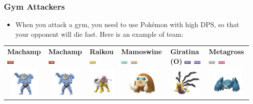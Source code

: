 \documentclass[8pt,aspectratio=169,compress]{beamer}
\newcommand{\fightingfull}{\includegraphics[height=0.15cm]{../../images/type/full/Fighting.png}}
\newcommand{\electricfull}{\includegraphics[height=0.15cm]{../../images/type/full/Electric.png}}
\newcommand{\ghostfull}{\includegraphics[height=0.15cm]{../../images/type/full/Ghost.png}}
\newcommand{\dragonfull}{\includegraphics[height=0.15cm]{../../images/type/full/Dragon.png}}
\newcommand{\groundfull}{\includegraphics[height=0.15cm]{../../images/type/full/Ground.png}}
\newcommand{\icefull}{\includegraphics[height=0.15cm]{../../images/type/full/Ice.png}}
\newcommand{\psychicfull}{\includegraphics[height=0.15cm]{../../images/type/full/Psychic.png}}
\newcommand{\steelfull}{\includegraphics[height=0.15cm]{../../images/type/full/Steel.png}}
\begin{document}
\begin{frame}
\frametitle{Gym Attackers}

\begin{block}{}
\begin{tiny}

\begin{itemize}
\item When you attack a gym, you need to use Pok\'emon with high DPS, so that your opponent will die fast. Here is an example of team:
\end{itemize}

\begin{tabular}{p{1.9cm}p{1.9cm}p{1.9cm}p{1.9cm}p{1.9cm}p{1.9cm}} 
\textbf{Machamp} \hfill \fightingfull & \textbf{Machamp} \hfill \fightingfull&  \textbf{Raikou} \hfill \electricfull&  \textbf{Mamoswine} \hfill  \icefull~\groundfull&  \textbf{Giratina (O)} \hfill \ghostfull~\dragonfull & \textbf{Metagross} \hfill \steelfull~\psychicfull  \\ 
\multicolumn{1}{c}{\includegraphics[width=1.5cm]{../../images/pokemon/Machamp}} &  \multicolumn{1}{c}{\includegraphics[width=1.5cm]{../../images/pokemon/Machamp}} &   \multicolumn{1}{c}{\includegraphics[width=1.5cm]{../../images/pokemon/Raikou} }  &   \multicolumn{1}{c}{\includegraphics[width=1.5cm]{../../images/pokemon/Mamoswine} }   &   \multicolumn{1}{c}{\includegraphics[width=1.5cm]{../../images/pokemon/Giratina_o} }   &   \multicolumn{1}{c}{\includegraphics[width=1.5cm]{../../images/pokemon/Metagross} } \\ \hline

\end{tabular}
\end{tiny}
\end{block}
\end{frame}
\end{document}
